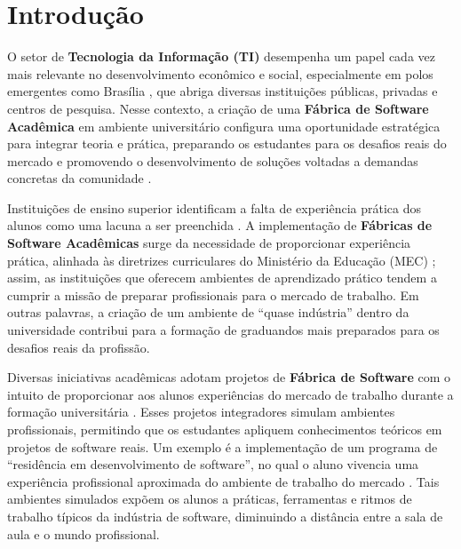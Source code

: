 \documentclass[
	12pt,           %
	openright,      %
	oneside,        %
	a4paper,        %
	brazil          %
]{abntex2}
\begin{document}
\section[Introdução]{Introdução}

O setor de \textbf{Tecnologia da Informação (TI)} desempenha um papel cada vez mais relevante no desenvolvimento econômico e social, especialmente em polos emergentes como Brasília \cite{ibge2025}, que abriga diversas instituições públicas, privadas e centros de pesquisa. Nesse contexto, a criação de uma \textbf{Fábrica de Software Acadêmica} em ambiente universitário configura uma oportunidade estratégica para integrar teoria e prática, preparando os estudantes para os desafios reais do mercado e promovendo o desenvolvimento de soluções voltadas a demandas concretas da comunidade \cite{dos2021experiencia, neto2017relato}.

Instituições de ensino superior identificam a falta de experiência prática dos alunos como uma lacuna a ser preenchida \cite{romanha2016modelo}. A implementação de \textbf{Fábricas de Software Acadêmicas} surge da necessidade de proporcionar experiência prática, alinhada às diretrizes curriculares do Ministério da Educação (MEC) \cite{dcncomputacao2016}; assim, as instituições que oferecem ambientes de aprendizado prático tendem a cumprir a missão de preparar profissionais para o mercado de trabalho. Em outras palavras, a criação de um ambiente de “quase indústria” dentro da universidade contribui para a formação de graduandos mais preparados para os desafios reais da profissão.

Diversas iniciativas acadêmicas adotam projetos de \textbf{Fábrica de Software} com o intuito de proporcionar aos alunos experiências do mercado de trabalho durante a formação universitária \cite{dos2021experiencia}. Esses projetos integradores simulam ambientes profissionais, permitindo que os estudantes apliquem conhecimentos teóricos em projetos de software reais. Um exemplo é a implementação de um programa de “residência em desenvolvimento de software”, no qual o aluno vivencia uma experiência profissional aproximada do ambiente de trabalho do mercado \cite{dos2021experiencia}. Tais ambientes simulados expõem os alunos a práticas, ferramentas e ritmos de trabalho típicos da indústria de software, diminuindo a distância entre a sala de aula e o mundo profissional.
\end{document}
